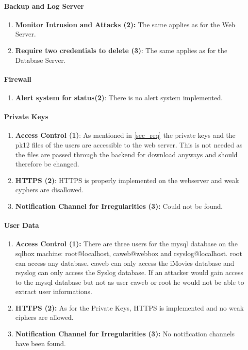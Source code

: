 \documentclass[english]{article}
\begin{document}
\paragraph{Backup and Log Server}
\begin{enumerate}[label=(\alph*)]
	\item \textbf{Monitor Intrusion and Attacks (2):} The same applies as for the Web Server.
	\item \textbf{Require two credentials to delete (3)}: The same applies as for the Database Server.
\end{enumerate} 

\paragraph{Firewall}   
\begin{enumerate}[label=(\alph*)] 
	\item \textbf{Alert system for status(2)}: There is no alert system implemented.
\end{enumerate}

\paragraph{Private Keys}
\begin{enumerate}[label=(\alph*)]
\item \textbf{Access Control (1)}: As mentioned in \ref{sec_req} the private keys and the pk12 files of the users are accessible to the web server. This is not needed as the files are passed through the backend for download anyways and should therefore be changed.
\item \textbf{HTTPS (2)}: HTTPS is properly implemented on the webserver and weak cyphers are disallowed.
\item \textbf{Notification Channel for Irregularities (3):} Could not be found.
\end{enumerate} 

\paragraph{User Data}
\begin{enumerate}[label=(\alph*)]
\item \textbf{Access Control (1):} There are three users for the mysql database on the sqlbox machine: root@localhost, caweb@webbox and rsyslog@localhost. root can access any database. caweb can only access the iMovies database and rsyslog can only access the Syslog database. If an attacker would gain access to the mysql database but not as user caweb or root he would not be able to extract user informations.
\item \textbf{HTTPS (2):} As for the Private Keys, HTTPS is implemented and no weak ciphers are allowed.
\item \textbf{Notification Channel for Irregularities (3):} No notification channels have been found.
\end{enumerate}
\end{document}
